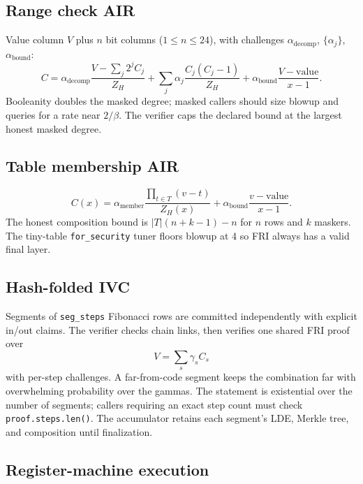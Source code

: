 \documentclass[11pt,a4paper]{article}
\begin{document}
\subsection{Range check AIR}

Value column $V$ plus $n$ bit columns ($1\le n\le24$), with challenges
$\alpha_{\mathrm{decomp}}$, $\{\alpha_j\}$, $\alpha_{\mathrm{bound}}$:
\[
C=\alpha_{\mathrm{decomp}}\frac{V-\sum_j2^jC_j}{Z_H}
+\sum_j\alpha_j\frac{C_j(C_j-1)}{Z_H}
+\alpha_{\mathrm{bound}}\frac{V-\mathrm{value}}{x-1}.
\]
Booleanity doubles the masked degree; masked callers should size blowup and
queries for a rate near $2/\beta$. The verifier caps the declared bound at
the largest honest masked degree.

\subsection{Table membership AIR}

\[
C(x)=\alpha_{\mathrm{member}}\frac{\prod_{t\in T}(v-t)}{Z_H(x)}
+\alpha_{\mathrm{bound}}\frac{v-\mathrm{value}}{x-1}.
\]
The honest composition bound is
$|T|(n+k-1)-n$ for $n$ rows and $k$ maskers. The tiny-table
\texttt{for\_security} tuner floors blowup at 4 so FRI always has a valid
final layer.

\subsection{Hash-folded IVC}

Segments of \texttt{seg\_steps} Fibonacci rows are committed independently
with explicit in/out claims. The verifier checks chain links, then verifies
one shared FRI proof over
\[
V=\sum_s\gamma_sC_s
\]
with per-step challenges. A far-from-code segment keeps the combination far
with overwhelming probability over the gammas. The statement is existential
over the number of segments; callers requiring an exact step count must check
\texttt{proof.steps.len()}. The accumulator retains each segment's LDE,
Merkle tree, and composition until finalization.

\subsection{Register-machine execution}
\end{document}
